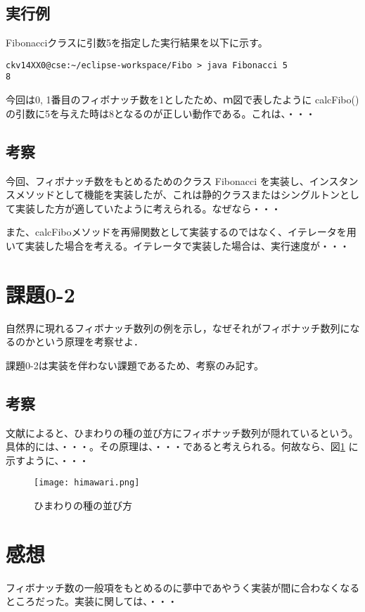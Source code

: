 \documentclass[a4j]{jarticle}
\begin{document}
\subsection{実行例}
Fibonacciクラスに引数5を指定した実行結果を以下に示す。

\begin{lstlisting}
ckv14XX0@cse:~/eclipse-workspace/Fibo > java Fibonacci 5
8
\end{lstlisting}

今回は0, 1番目のフィボナッチ数を1としたため、ｍ図で表したように calcFibo() の引数に5を与えた時は8となるのが正しい動作である。これは、・・・
\subsection{考察}
今回、フィボナッチ数をもとめるためのクラス Fibonacci を実装し、インスタンスメソッドとして機能を実装したが、これは静的クラスまたはシングルトンとして実装した方が適していたように考えられる。なぜなら・・・

また、calcFiboメソッドを再帰関数として実装するのではなく、イテレータを用いて実装した場合を考える。イテレータで実装した場合は、実行速度が・・・


\section{課題0-2}
\begin{screen}
  自然界に現れるフィボナッチ数列の例を示し，なぜそれがフィボナッチ数列になるのかという原理を考察せよ．
\end{screen}

課題0-2は実装を伴わない課題であるため、考察のみ記す。

\subsection{考察}
文献\cite{kijima2012}によると、ひまわりの種の並び方にフィボナッチ数列が隠れているという。具体的には、・・・。その原理は、・・・であると考えられる。何故なら、図\ref{fig:himawari} \cite{notty} に示すように、・・・

\begin{figure}[!hbt]
  \centering
  \texttt{[image: himawari.png]}
  \caption{ひまわりの種の並び方}
  \label{fig:himawari}
\end{figure}


\section{感想}
フィボナッチ数の一般項をもとめるのに夢中であやうく実装が間に合わなくなるところだった。実装に関しては、・・・
\end{document}
